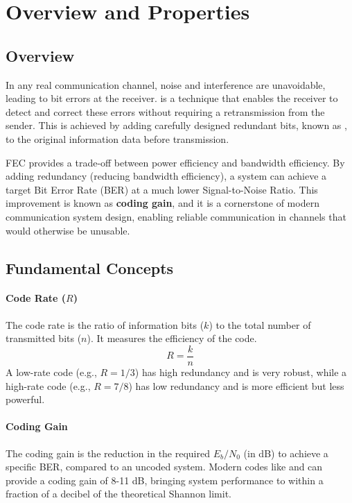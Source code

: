 \section{Overview and Properties}

\subsection{Overview}

In any real communication channel, noise and interference are unavoidable, leading to bit errors at the receiver.  is a technique that enables the receiver to detect and correct these errors without requiring a retransmission from the sender. This is achieved by adding carefully designed redundant bits, known as , to the original information data before transmission.

\begin{keyconcept}
    FEC provides a trade-off between power efficiency and bandwidth efficiency. By adding redundancy (reducing bandwidth efficiency), a system can achieve a target Bit Error Rate (BER) at a much lower Signal-to-Noise Ratio. This improvement is known as \textbf{coding gain}, and it is a cornerstone of modern communication system design, enabling reliable communication in channels that would otherwise be unusable.
\end{keyconcept}


\subsection{Fundamental Concepts}

\paragraph{Code Rate ($R$)}
The code rate is the ratio of information bits ($k$) to the total number of transmitted bits ($n$). It measures the efficiency of the code.
\begin{equation}
    R = \frac{k}{n}
\end{equation}
A low-rate code (e.g., $R=1/3$) has high redundancy and is very robust, while a high-rate code (e.g., $R=7/8$) has low redundancy and is more efficient but less powerful.

\paragraph{Coding Gain}
The coding gain is the reduction in the required $E_b/N_0$ (in dB) to achieve a specific BER, compared to an uncoded system. Modern codes like  and  can provide a coding gain of 8-11 dB, bringing system performance to within a fraction of a decibel of the theoretical Shannon limit.


